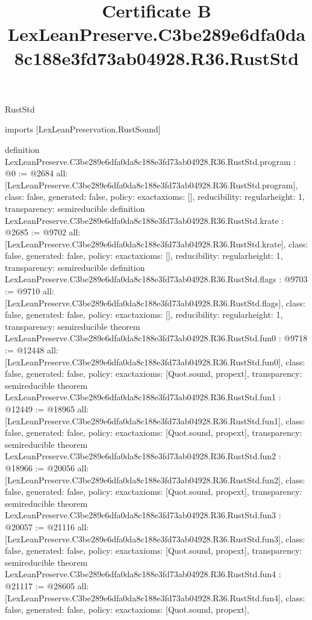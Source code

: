 \begin{lexlean}{RustStd}
\title{Certificate B LexLeanPreserve.C3be289e6dfa0da8c188e3fd73ab04928.R36.RustStd}
\begin{coremodule}
imports [LexLeanPreservation.RustSound]

definition LexLeanPreserve.C3be289e6dfa0da8c188e3fd73ab04928.R36.RustStd.program : @0 := @2684 {
  all: [LexLeanPreserve.C3be289e6dfa0da8c188e3fd73ab04928.R36.RustStd.program],
  class: false,
  generated: false,
  policy: exact{axioms: []},
  reducibility: regular{height: 1},
  transparency: semireducible
}
definition LexLeanPreserve.C3be289e6dfa0da8c188e3fd73ab04928.R36.RustStd.krate : @2685 := @9702 {
  all: [LexLeanPreserve.C3be289e6dfa0da8c188e3fd73ab04928.R36.RustStd.krate],
  class: false,
  generated: false,
  policy: exact{axioms: []},
  reducibility: regular{height: 1},
  transparency: semireducible
}
definition LexLeanPreserve.C3be289e6dfa0da8c188e3fd73ab04928.R36.RustStd.flags : @9703 := @9710 {
  all: [LexLeanPreserve.C3be289e6dfa0da8c188e3fd73ab04928.R36.RustStd.flags],
  class: false,
  generated: false,
  policy: exact{axioms: []},
  reducibility: regular{height: 1},
  transparency: semireducible
}
theorem LexLeanPreserve.C3be289e6dfa0da8c188e3fd73ab04928.R36.RustStd.fun0 : @9718 := @12448 {
  all: [LexLeanPreserve.C3be289e6dfa0da8c188e3fd73ab04928.R36.RustStd.fun0],
  class: false,
  generated: false,
  policy: exact{axioms: [Quot.sound, propext]},
  transparency: semireducible
}
theorem LexLeanPreserve.C3be289e6dfa0da8c188e3fd73ab04928.R36.RustStd.fun1 : @12449 := @18965 {
  all: [LexLeanPreserve.C3be289e6dfa0da8c188e3fd73ab04928.R36.RustStd.fun1],
  class: false,
  generated: false,
  policy: exact{axioms: [Quot.sound, propext]},
  transparency: semireducible
}
theorem LexLeanPreserve.C3be289e6dfa0da8c188e3fd73ab04928.R36.RustStd.fun2 : @18966 := @20056 {
  all: [LexLeanPreserve.C3be289e6dfa0da8c188e3fd73ab04928.R36.RustStd.fun2],
  class: false,
  generated: false,
  policy: exact{axioms: [Quot.sound, propext]},
  transparency: semireducible
}
theorem LexLeanPreserve.C3be289e6dfa0da8c188e3fd73ab04928.R36.RustStd.fun3 : @20057 := @21116 {
  all: [LexLeanPreserve.C3be289e6dfa0da8c188e3fd73ab04928.R36.RustStd.fun3],
  class: false,
  generated: false,
  policy: exact{axioms: [Quot.sound, propext]},
  transparency: semireducible
}
theorem LexLeanPreserve.C3be289e6dfa0da8c188e3fd73ab04928.R36.RustStd.fun4 : @21117 := @28605 {
  all: [LexLeanPreserve.C3be289e6dfa0da8c188e3fd73ab04928.R36.RustStd.fun4],
  class: false,
  generated: false,
  policy: exact{axioms: [Quot.sound, propext]},
}
\end{coremodule}
\end{lexlean}
